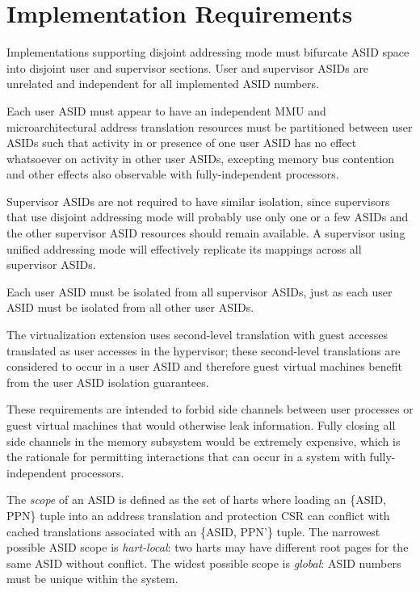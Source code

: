 \section{Implementation Requirements}

Implementations supporting disjoint addressing mode must bifurcate ASID
space into disjoint user and supervisor sections.  User and supervisor
ASIDs are unrelated and independent for all implemented ASID numbers.

Each user ASID must appear to have an independent MMU and
microarchitectural address translation resources must be partitioned
between user ASIDs such that activity in or presence of one user ASID has
no effect whatsoever on activity in other user ASIDs, excepting memory bus
contention and other effects also observable with fully-independent
processors.

Supervisor ASIDs are not required to have similar isolation, since
supervisors that use disjoint addressing mode will probably use only one or
a few ASIDs and the other supervisor ASID resources should remain
available.  A supervisor using unified addressing mode will effectively
replicate its mappings across all supervisor ASIDs.

Each user ASID must be isolated from all supervisor ASIDs, just as each
user ASID must be isolated from all other user ASIDs.

The virtualization extension uses second-level translation with guest
accesses translated as user accesses in the hypervisor; these second-level
translations are considered to occur in a user ASID and therefore guest
virtual machines benefit from the user ASID isolation guarantees.

\begin{commentary}
These requirements are intended to forbid side channels between user
processes or guest virtual machines that would otherwise leak information.
Fully closing all side channels in the memory subsystem would be extremely
expensive, which is the rationale for permitting interactions that can
occur in a system with fully-independent processors.
\end{commentary}

The {\em scope} of an ASID is defined as the set of harts where loading an
\{ASID, PPN\} tuple into an address translation and protection CSR can
conflict with cached translations associated with an \{ASID, PPN'\} tuple.
The narrowest possible ASID scope is {\em hart-local}: two harts may have
different root pages for the same ASID without conflict.  The widest
possible scope is {\em global}: ASID numbers must be unique within the
system.

